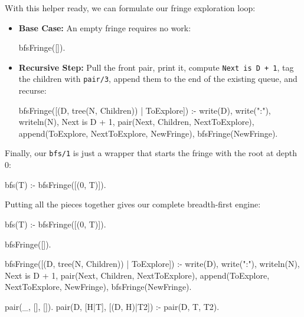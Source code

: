 With this helper ready, we can formulate our fringe exploration loop:
\begin{itemize}
    \item \textbf{Base Case:} An empty fringe requires no work:
\begin{codeblock}
bfsFringe([]).
\end{codeblock}
    \item \textbf{Recursive Step:} Pull the front pair, print it, compute \texttt{Next is D + 1}, tag the children with \texttt{pair/3}, append them to the end of the existing queue, and recurse:
\begin{codeblock}
bfsFringe([(D, tree(N, Children)) | ToExplore]) :-
    write(D), write(":"), writeln(N),
    Next is D + 1,
    pair(Next, Children, NextToExplore),
    append(ToExplore, NextToExplore, NewFringe),
    bfsFringe(NewFringe).
\end{codeblock}
\end{itemize}

Finally, our \texttt{bfs/1} is just a wrapper that starts the fringe with the root at depth $0$:

\begin{codeblock}
bfs(T) :-
    bfsFringe([(0, T)]).
\end{codeblock}

Putting all the pieces together gives our complete breadth-first engine:

\begin{codeblock}
bfs(T) :-
    bfsFringe([(0, T)]).

bfsFringe([]).

bfsFringe([(D, tree(N, Children)) | ToExplore]) :-
    write(D), write(":"), writeln(N),
    Next is D + 1,
    pair(Next, Children, NextToExplore),
    append(ToExplore, NextToExplore, NewFringe),
    bfsFringe(NewFringe).

pair(_, [], []).
pair(D, [H|T], [(D, H)|T2]) :-
    pair(D, T, T2).
\end{codeblock}

